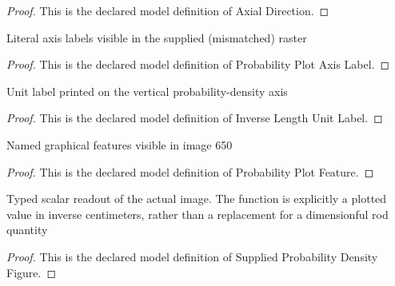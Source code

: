 \begin{proof}
  This is the declared model definition of Axial Direction.
\end{proof}
\begin{definition}
  \label{def:physics:phyx-mini-0650:phyxminiproblems-problemphyxmini0650-probabilityplotaxislabel}
  Literal axis labels visible in the supplied (mismatched) raster
\end{definition}
\begin{proof}
  This is the declared model definition of Probability Plot Axis Label.
\end{proof}
\begin{definition}
  \label{def:physics:phyx-mini-0650:phyxminiproblems-problemphyxmini0650-inverselengthunitlabel}
  Unit label printed on the vertical probability-density axis
\end{definition}
\begin{proof}
  This is the declared model definition of Inverse Length Unit Label.
\end{proof}
\begin{definition}
  \label{def:physics:phyx-mini-0650:phyxminiproblems-problemphyxmini0650-probabilityplotfeature}
  Named graphical features visible in image 650
\end{definition}
\begin{proof}
  This is the declared model definition of Probability Plot Feature.
\end{proof}
\begin{definition}
  \label{def:physics:phyx-mini-0650:phyxminiproblems-problemphyxmini0650-suppliedprobabilitydensityfigure}
  Typed scalar readout of the actual image. The function is explicitly a plotted value in inverse centimeters, rather than a replacement for a dimensionful rod quantity
\end{definition}
\begin{proof}
  This is the declared model definition of Supplied Probability Density Figure.
\end{proof}
